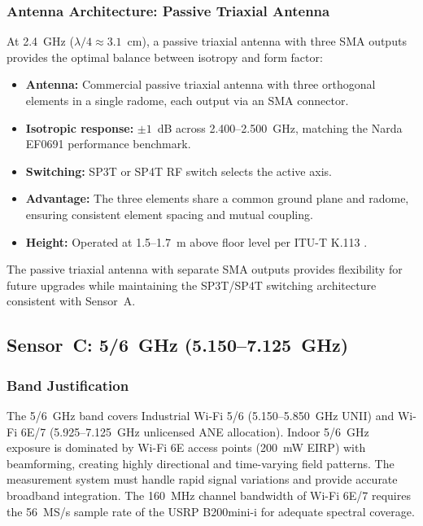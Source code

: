 \documentclass[11pt,a4paper]{article}
\begin{document}
\subsubsection{Antenna Architecture: Passive Triaxial Antenna}

At 2.4~GHz ($\lambda/4 \approx 3.1$~cm), a passive triaxial antenna with three SMA outputs provides the optimal balance between isotropy and form factor:

\begin{itemize}
    \item \textbf{Antenna:} Commercial passive triaxial antenna with three orthogonal elements in a single radome, each output via an SMA connector.
    \item \textbf{Isotropic response:} $\pm 1$~dB across 2.400--2.500~GHz, matching the Narda EF0691 performance benchmark.
    \item \textbf{Switching:} SP3T or SP4T RF switch selects the active axis.
    \item \textbf{Advantage:} The three elements share a common ground plane and radome, ensuring consistent element spacing and mutual coupling.
    \item \textbf{Height:} Operated at 1.5--1.7~m above floor level per ITU-T K.113 \cite{itut_k113}.
\end{itemize}

\noindent The passive triaxial antenna with separate SMA outputs provides flexibility for future upgrades while maintaining the SP3T/SP4T switching architecture consistent with Sensor~A.

\subsection{Sensor~C: 5/6~GHz (5.150--7.125~GHz)}

\subsubsection{Band Justification}

The 5/6~GHz band covers Industrial Wi-Fi 5/6 (5.150--5.850~GHz UNII) and Wi-Fi 6E/7 (5.925--7.125~GHz unlicensed ANE allocation). Indoor 5/6~GHz exposure is dominated by Wi-Fi 6E access points (200~mW EIRP) with beamforming, creating highly directional and time-varying field patterns. The measurement system must handle rapid signal variations and provide accurate broadband integration. The 160~MHz channel bandwidth of Wi-Fi 6E/7 requires the 56~MS/s sample rate of the USRP B200mini-i for adequate spectral coverage.
\end{document}
